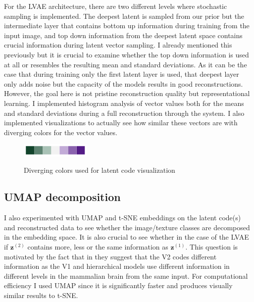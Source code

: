 \documentclass[12pt, english]{article}
\begin{document}
\vspace{4mm}

\par For the LVAE architecture, there are two different levels where stochastic sampling is implemented. The deepest latent is sampled from our prior but the intermediate layer that contains bottom up information during training from the input image, and top down information from the deepest latent space contains crucial information during latent vector sampling. I already mentioned this previously but it is crucial to examine whether the top down information is used at all or resembles the resulting mean and standard deviations. As it can be the case that during training only the first latent layer is used, that deepest layer only adds noise but the capacity of the models results in good reconstructions. However, the goal here is not pristine reconstruction quality but representational learning. I implemented histogram analysis of vector values both for the means and standard deviations during a full reconstruction through the system. I also implemented visualizations to actually see how similar these vectors are with diverging colors for the vector values.

\vspace{4mm}

\begin{figure}[H]
    \centering
    \includegraphics[width=0.3\textwidth]{diverging_color.png}
    \label{fig:diverging_colors}
    \caption{Diverging colors used for latent code visualization}
\end{figure}

\vspace{4mm}

\subsection{UMAP decomposition}

\vspace{4mm}

\par I also experimented with UMAP \cite{mcinnes2018umap} and  t-SNE \cite{maaten2008visualizing} embeddings on the latent code(s) and reconstructed data to see whether the image/texture classes are decomposed in the embedding space. It is also crucial to see whether in the case of the LVAE if $\bm{z}^{(2)}$ contains more, less or the same information as $\bm{z}^{(1)}$. This question is motivated by the fact that in \cite{ZiembaV2} they suggest that the V2 codes different information as the V1 and hierarchical models use different information in different levels in the mammalian brain from the same input. For computational efficiency I used UMAP since it is significantly faster and produces visually similar results to t-SNE.
\end{document}
